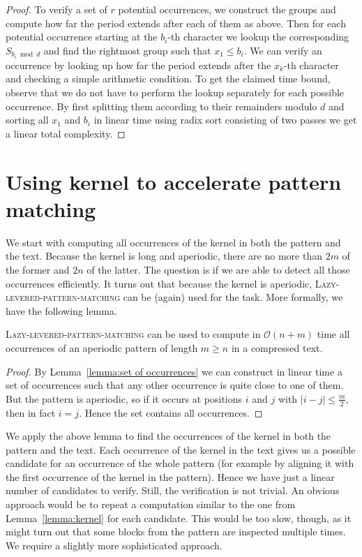 \documentclass[runningheads]{llncs}
\newcommand{\proc}[1]{\textnormal{\scshape#1}}
\begin{document}
\begin{proof}
To verify a set of $r$ potential occurrences, we construct the groups and compute how far the period extends after each of them as above. Then for each potential occurrence starting at the $b_{i}$-th character 
we lookup the corresponding $S_{b_{i}\bmod d}$ and find the rightmost group such that $x_{1}\leq b_{i}$.  We can verify an occurrence by
looking up how far the period extends after the $x_{k}$-th character and checking a simple arithmetic condition. To get the claimed time bound, observe that we do not have to perform the lookup separately for each possible occurrence. By first splitting them according to their remainders modulo $d$ and sorting all $x_{1}$ and $b_{i}$ in linear time using radix sort consisting of two passes we get a linear total complexity.
\end{proof}

\section{Using kernel to accelerate pattern matching}
\label{section:kernel}

We start with computing all occurrences of the kernel in both the pattern and the text. Because the kernel is long and aperiodic, there are no more than $2m$ of the former and $2n$ of the latter. The question is if we are able to detect all those occurrences efficiently. It turns out
that because the kernel is aperiodic, \proc{Lazy-levered-pattern-matching} can be (again) used for the task. More formally, we have the following
lemma.

\begin{lemma}\label{lemma:aperiodic}
\proc{Lazy-levered-pattern-matching} can be used to compute in $\mathcal{O}(n+m)$ time all occurrences of an aperiodic pattern of length $m\geq n$ in a compressed text. 
\end{lemma}

\begin{proof}
By Lemma~\ref{lemma:set of occurrences} we can construct in linear time a set of occurrences such that any other occurrence is quite close to one of them. But the pattern is aperiodic, so if it occurs at positions $i$ and $j$ with $|i-j|\leq\frac{m}{2}$, then in fact $i=j$. Hence the set contains all occurrences.
\end{proof}

We apply the above lemma to find the occurrences of the kernel in both the pattern and the text. Each occurrence of the kernel in the text gives us a 
possible candidate for an occurrence of the whole pattern (for example by aligning it with the first occurrence of the kernel in the pattern). Hence
we have just a linear number of candidates to verify. Still, the verification is not trivial. An obvious approach would be to repeat a computation
similar to the one from Lemma~\ref{lemma:kernel} for each candidate. This would be too slow, though, as it might turn out that some blocks from the pattern are inspected multiple times. We require a slightly more sophisticated approach.
\end{document}
